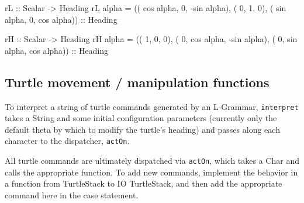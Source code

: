 \documentclass[]{article}
\newenvironment{Shaded}{}{}
\newcommand{\KeywordTok}[1]{\textcolor[rgb]{0.00,0.44,0.13}{\textbf{{#1}}}}
\newcommand{\DataTypeTok}[1]{\textcolor[rgb]{0.56,0.13,0.00}{{#1}}}
\newcommand{\DecValTok}[1]{\textcolor[rgb]{0.25,0.63,0.44}{{#1}}}
\newcommand{\OtherTok}[1]{\textcolor[rgb]{0.00,0.44,0.13}{{#1}}}
\newcommand{\FunctionTok}[1]{\textcolor[rgb]{0.02,0.16,0.49}{{#1}}}
\newcommand{\NormalTok}[1]{{#1}}
\begin{document}
\begin{Shaded}
\begin{Highlighting}[]
\OtherTok{rL       ::} \DataTypeTok{Scalar} \OtherTok{->} \DataTypeTok{Heading}
\NormalTok{rL alpha  }\FunctionTok{=} \NormalTok{(( }\FunctionTok{cos} \NormalTok{alpha, }\DecValTok{0}\NormalTok{, }\FunctionTok{-sin} \NormalTok{alpha),}
             \NormalTok{( }\DecValTok{0}\NormalTok{,         }\DecValTok{1}\NormalTok{,          }\DecValTok{0}\NormalTok{),}
             \NormalTok{( }\FunctionTok{sin} \NormalTok{alpha, }\DecValTok{0}\NormalTok{,  }\FunctionTok{cos} \NormalTok{alpha))}\OtherTok{ ::} \DataTypeTok{Heading}
\end{Highlighting}
\end{Shaded}
\begin{Shaded}
\begin{Highlighting}[]
\OtherTok{rH       ::} \DataTypeTok{Scalar} \OtherTok{->} \DataTypeTok{Heading}
\NormalTok{rH alpha  }\FunctionTok{=} \NormalTok{(( }\DecValTok{1}\NormalTok{,         }\DecValTok{0}\NormalTok{,          }\DecValTok{0}\NormalTok{),}
             \NormalTok{( }\DecValTok{0}\NormalTok{, }\FunctionTok{cos} \NormalTok{alpha, }\FunctionTok{-sin} \NormalTok{alpha),}
             \NormalTok{( }\DecValTok{0}\NormalTok{, }\FunctionTok{sin} \NormalTok{alpha,  }\FunctionTok{cos} \NormalTok{alpha))}\OtherTok{ ::} \DataTypeTok{Heading}
\end{Highlighting}
\end{Shaded}
\subsection{Turtle movement / manipulation functions}

To interpret a string of turtle commands generated by an L-Grammar,
\texttt{interpret} takes a String and some initial configuration
parameters (currently only the default theta by which to modify the
turtle's heading) and passes along each character to the dispatcher,
\texttt{actOn}.

\begin{Shaded}
\end{Shaded}
All turtle commands are ultimately dispatched via \texttt{actOn}, which
takes a Char and calls the appropriate function. To add new commands,
implement the behavior in a function from TurtleStack to IO TurtleStack,
and then add the appropriate command here in the case statement.
\end{document}
